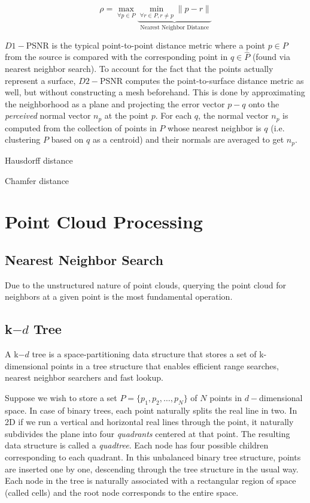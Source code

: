 \documentclass[a4paper, 11pt, twocolumn]{article}
\begin{document}
$$
\rho = \max_{\forall p \in P} \underbrace{\min_{\forall r \in P, r \neq p} \|p - r\|}_{\text{Nearest Neighbor Distance}}
$$

$D1-$PSNR is the typical point-to-point distance metric where a point $p\in P$ from the source is compared with the corresponding point in $q \in \hat{P}$ (found via nearest neighbor search). To account for the fact that the points actually represent a surface, $D2-$PSNR computes the point-to-surface distance metric as well, but without constructing a mesh beforehand. This is done by approximating the neighborhood as a plane and projecting the error vector $p - q$ onto the \textit{perceived} normal vector $n_p$ at the point $p$. For each $q$, the normal vector $n_p$ is computed from the collection of points in $P$ whose nearest neighbor is $q$ (i.e. clustering $P$ based on $q$ as a centroid) and their normals are averaged to get $n_p$.

Hausdorff distance

Chamfer distance

\section{Point Cloud Processing}


\subsection{Nearest Neighbor Search}
Due to the unstructured nature of point clouds, querying the point cloud for neighbors at a given point is the most fundamental operation.



\subsection{k$-d$ Tree}
A k$-d$ tree is a space-partitioning data structure that stores a set of k-dimensional points in a tree structure that enables efficient range searches, nearest neighbor searchers and fast lookup.

Suppose we wish to store a set $P = \{p_1, p_2, \ldots, p_N\}$ of $N$ points in $d-$dimensional space. In case of binary trees, each point naturally splits the real line in two. In 2D if we run a vertical and horizontal real lines through the point, it naturally subdivides the plane into four \textit{quadrants} centered at that point. The resulting data structure is called a \textit{quadtree}. Each node has four possible children corresponding to each quadrant. In this unbalanced binary tree structure, points are inserted one by one, descending through the tree structure in the usual way. Each node in the tree is naturally associated with a rectangular region of space (called cells) and the root node corresponds to the entire space.
\end{document}
